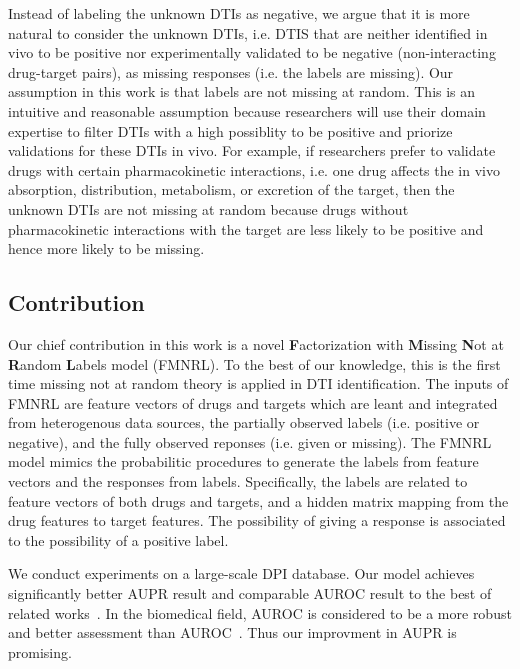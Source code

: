 \documentclass[sigconf,anonymous]{acmart}
\begin{document}
Instead of labeling the unknown DTIs as negative, we argue that it is more natural to consider the unknown DTIs, i.e. DTIS that are neither identified in vivo to be positive nor experimentally validated to be negative (non-interacting drug-target pairs), as missing responses (i.e. the labels are missing). Our assumption in this work is that labels are not missing at random. This is an intuitive and reasonable assumption because researchers will use their domain expertise to filter DTIs with a high possiblity to be positive and priorize validations for these DTIs in vivo. For example, if researchers prefer to validate drugs with certain pharmacokinetic interactions, i.e. one drug affects the in vivo absorption, distribution, metabolism, or excretion of the target, then the unknown DTIs are not missing at random because drugs without pharmacokinetic interactions with the target are less likely to be positive and hence more likely to be missing.   

\subsection{Contribution}
Our chief contribution in this work is a novel \textbf{F}actorization with \textbf{M}issing \textbf{N}ot at \textbf{R}andom \textbf{L}abels model (FMNRL). To the best of our knowledge, this is the first time missing not at random theory is applied in DTI identification. The inputs of FMNRL are feature vectors of drugs and targets which are leant and integrated from heterogenous data sources, the partially observed labels (i.e. positive or negative), and the fully observed reponses (i.e. given or missing). The FMNRL model mimics the probabilitic procedures to generate the labels from feature vectors and the responses from labels. Specifically, the labels are related to feature vectors of both drugs and targets, and a hidden matrix mapping from the drug features to target features. The possibility of giving a response is associated to the possibility of a positive label.  

We conduct experiments on a large-scale DPI database. Our model achieves significantly better AUPR result and comparable AUROC result to the best of related works~\cite{Luo2017Network}. In the biomedical field, AUROC is considered to be a more robust and better assessment than AUROC~\cite{Luo2017Network}. Thus our improvment in AUPR is promising.
\end{document}
